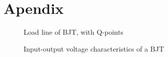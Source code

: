\documentclass[a4paper,11pt]{article}
\begin{document}
 

\pagebreak
\section*{Apendix}
\begin{figure}[h]
 \begin{center}
  \vspace{-10pt}
  \caption{Load line of BJT, with Q-points}
 \end{center}
\end{figure}

\begin{figure}[h]
  \vspace{-15pt}
 \begin{center}
  \caption{Input-output voltage characteristics of a BJT}
 \end{center}
\end{figure}
\end{document}
